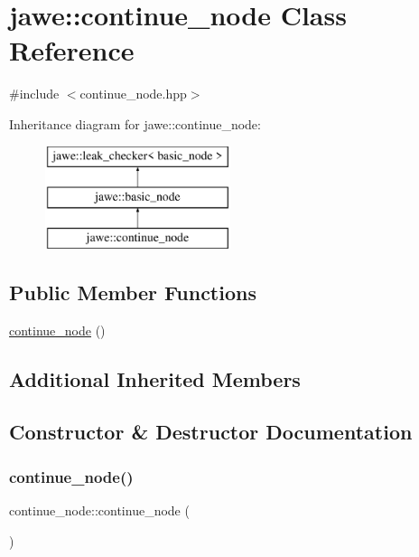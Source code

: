 \hypertarget{classjawe_1_1continue__node}{}\section{jawe\+:\+:continue\+\_\+node Class Reference}
\label{classjawe_1_1continue__node}


{\ttfamily \#include $<$continue\+\_\+node.\+hpp$>$}

Inheritance diagram for jawe\+:\+:continue\+\_\+node\+:\begin{figure}[H]
\begin{center}
\leavevmode
\includegraphics[height=3.000000cm]{classjawe_1_1continue__node}
\end{center}
\end{figure}
\subsection*{Public Member Functions}
\begin{DoxyCompactItemize}
\item 
\hyperlink{classjawe_1_1continue__node_ac9a52325e5f9b5cecb1b8279d7303817}{continue\+\_\+node} ()
\end{DoxyCompactItemize}
\subsection*{Additional Inherited Members}


\subsection{Constructor \& Destructor Documentation}
\mbox{\label{classjawe_1_1continue__node_ac9a52325e5f9b5cecb1b8279d7303817}} 
\subsubsection{\texorpdfstring{continue\+\_\+node()}{continue\_node()}}
{\footnotesize\ttfamily continue\+\_\+node\+::continue\+\_\+node (\begin{DoxyParamCaption}{ }\end{DoxyParamCaption})}



